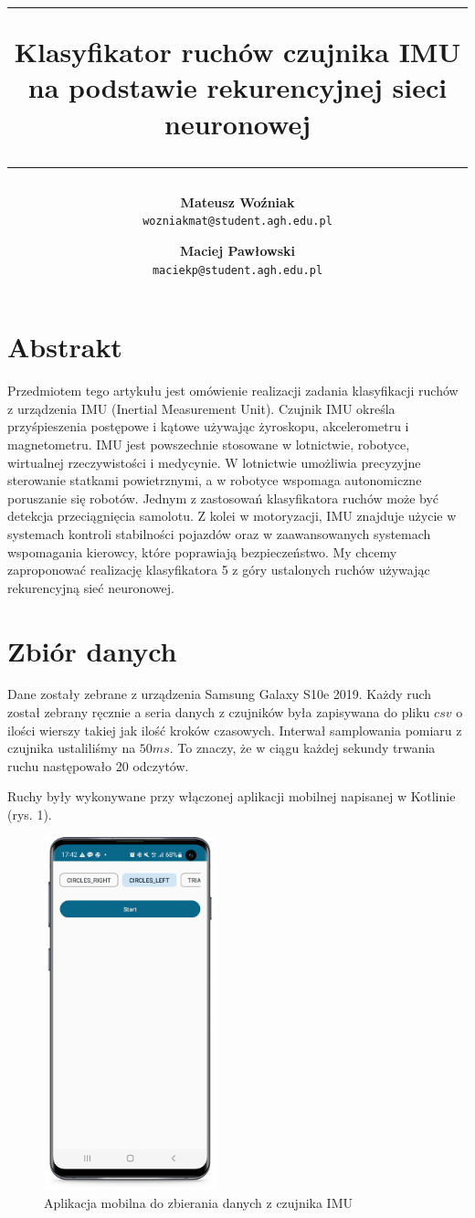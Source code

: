 \documentclass[10pt]{article}
\title{
\rule{\linewidth}{3pt}
Klasyfikator ruchów czujnika IMU na podstawie rekurencyjnej sieci neuronowej
\rule{\linewidth}{1pt}
}
\author{
  \textbf{Mateusz Woźniak}\\
  \texttt{wozniakmat@student.agh.edu.pl}
  \and
  \textbf{Maciej Pawłowski}\\
  \texttt{maciekp@student.agh.edu.pl}
}
\date{}
\begin{document}
\maketitle

\section{Abstrakt}

Przedmiotem tego artykułu jest omówienie realizacji zadania klasyfikacji ruchów z urządzenia IMU (Inertial Measurement Unit). Czujnik IMU określa przyśpieszenia postępowe i kątowe używając żyroskopu, akcelerometru i magnetometru. 
IMU jest powszechnie stosowane w lotnictwie, robotyce, wirtualnej rzeczywistości i medycynie. W lotnictwie umożliwia precyzyjne sterowanie statkami powietrznymi, a w robotyce wspomaga autonomiczne poruszanie się robotów. Jednym z zastosowań klasyfikatora ruchów może być detekcja przeciągnięcia samolotu. Z kolei w motoryzacji, IMU znajduje użycie w systemach kontroli stabilności pojazdów oraz w zaawansowanych systemach wspomagania kierowcy, które poprawiają bezpieczeństwo. My chcemy zaproponować realizację klasyfikatora 5 z góry ustalonych ruchów używając rekurencyjną sieć neuronowej. 

\section{Zbiór danych}
Dane zostały zebrane z urządzenia Samsung Galaxy S10e 2019. Każdy ruch został zebrany ręcznie a seria danych z czujników była zapisywana do pliku $csv$ o ilości wierszy takiej jak ilość kroków czasowych. Interwał samplowania pomiaru z czujnika ustaliliśmy na $50ms$. To znaczy, że w ciągu każdej sekundy trwania ruchu następowało 20 odczytów.

Ruchy były wykonywane przy włączonej aplikacji mobilnej napisanej w Kotlinie (rys. 1).

\begin{figure}[h]
\label{fig:screenshot}
\includegraphics[width=5cm]{s1.png}
\centering
\caption{Aplikacja mobilna do zbierania danych z czujnika IMU}
\end{figure}
\end{document}
